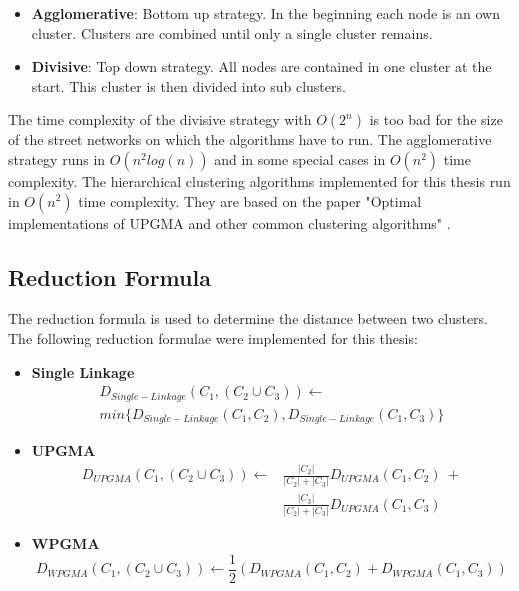 \documentclass[11pt, a4paper]{report}
\begin{document}
\begin{itemize}
    \item \textbf{Agglomerative}: Bottom up strategy. In the beginning each node is an own cluster. Clusters are combined until only a single cluster remains.
    \item \textbf{Divisive}: Top down strategy. All nodes are contained in one cluster at the start. This cluster is then divided into sub clusters.
\end{itemize}

The time complexity of the divisive strategy with $O(2^n)$ is too bad for the size of the street networks on which the algorithms have to run. The agglomerative strategy runs in $O(n^2 log(n))$ and in some special cases in $O(n^2)$ time complexity. The hierarchical clustering algorithms implemented for this thesis run in $O(n^2)$ time complexity. They are based on the paper "Optimal implementations of UPGMA and other common clustering algorithms" \cite{clustering:2007}.

\subsection{Reduction Formula}
The reduction formula is used to determine the distance between two clusters.
The following reduction formulae were implemented for this thesis:

\begin{itemize}
    \item \textbf{Single Linkage}
    \begin{multline}
    D_{Single-Linkage}(C_1, (C_2 \cup C_3)) \leftarrow \\
    min \{ D_{Single-Linkage}(C_1, C_2), D_{Single-Linkage}(C_1, C_3) \}
    \end{multline}
    \item \textbf{UPGMA}
    \begin{equation}
    \begin{split}
    D_{UPGMA}(C_1, (C_2 \cup C_3)) \leftarrow &\frac{|C_2|}{|C_2|+|C_3|}D_{UPGMA}(C_1, C_2)\ + \\ &\frac{|C_3|}{|C_2|+|C_3|}D_{UPGMA}(C_1, C_3)
    \end{split}
    \end{equation}
    \item \textbf{WPGMA}
    \begin{equation}
    D_{WPGMA}(C_1, (C_2 \cup C_3)) \leftarrow \frac{1}{2} (D_{WPGMA}(C_1, C_2) + D_{WPGMA}(C_1, C_3))
    \end{equation}
\end{itemize}
\end{document}
